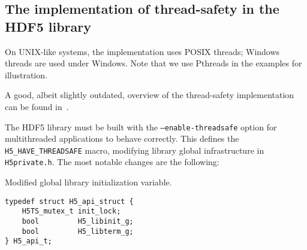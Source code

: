 \subsection{The implementation of thread-safety in the HDF5 library}\label{sec:H5TS-impl}

On UNIX-like systems, the implementation uses POSIX threads; Windows threads are used under Windows. Note that we use Pthreads in the examples for illustration.

A good, albeit slightly outdated, overview of the thread-safety implementation can be found in~\cite{libhdf5-ts}.

The HDF5 library must be built with the \texttt{--enable-threadsafe} option for multithreaded applications to behave correctly.
This defines the \texttt{H5\_HAVE\_THREADSAFE} macro, modifying library global infrastructure in \texttt{H5private.h}. The most notable changes are the following:

\begin{listing}
\centering
\caption{Modified global library initialization variable.}
\label{lst:pthreads-init}
\begin{verbatim}
typedef struct H5_api_struct {
    H5TS_mutex_t init_lock;
    bool         H5_libinit_g;
    bool         H5_libterm_g;
} H5_api_t;
\end{verbatim}
\end{listing}

